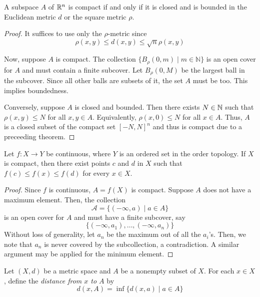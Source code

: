 \begin{theorem}
    A subspace $A$ of $\mathbb{R}^n$ is compact if and only if it is closed and is bounded in the Euclidean metric $d$ or the square metric $\rho$.
\end{theorem}
\begin{proof}
    It suffices to use only the $\rho$-metric since 
    \begin{equation*}
        \rho(x,y)\le d(x,y)\le\sqrt{n}\rho(x,y)
    \end{equation*}

    Now, suppose $A$ is compact. The collection $\{B_\rho(0, m)\mid m\in\mathbb{N}\}$ is an open cover for $A$ and must contain a finite subcover. Let $B_\rho(0, M)$ be the largest ball in the subcover. Since all other balls are subsets of it, the set $A$ must be too. This implies boundedness.

    Conversely, suppose $A$ is closed and bounded. Then there exists $N\in\mathbb{N}$ such that $\rho(x,y)\le N$ for all $x,y\in A$. Equivalently, $\rho(x,0)\le N$ for all $x\in A$. Thus, $A$ is a closed subset of the compact set $[-N, N]^n$ and thus is compact due to a preceeding theorem.
\end{proof}

\begin{theorem}
    Let $f:X\to Y$ be continuous, where $Y$ is an ordered set in the order topology. If $X$ is compact, then there exist points $c$ and $d$ in $X$ such that $f(c)\le f(x)\le f(d)$ for every $x\in X$.
\end{theorem}
\begin{proof}
    Since $f$ is continuous, $A = f(X)$ is compact. Suppose $A$ does not have a maximum element. Then, the collection 
    \begin{equation*}
        \mathscr{A} = \{(-\infty, a)\mid a\in A\}
    \end{equation*}
    is an open cover for $A$ and must have a finite subcover, say 
    \begin{equation*}
        \{(-\infty, a_1),\ldots,(-\infty, a_n)\}
    \end{equation*}
    Without loss of generality, let $a_n$ be the maximum out of all the $a_i$'s. Then, we note that $a_n$ is never covered by the subcollection, a contradiction. A similar argument may be applied for the minimum element.
\end{proof}

\begin{definition}
    Let $(X,d)$ be a metric space and $A$ be a nonempty subset of $X$. For each $x\in X$, define the \textit{distance from $x$ to $A$} by 
    \begin{equation*}
        d(x, A) = \inf\{d(x,a)\mid a\in A\}
    \end{equation*}
\end{definition}

